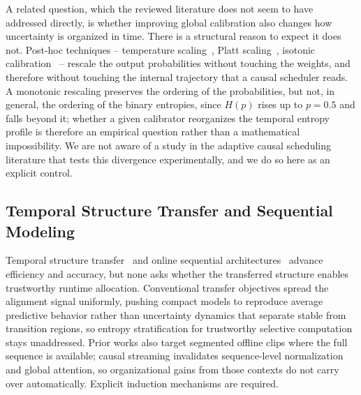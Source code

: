 \documentclass[a4paper,fleqn]{cas-dc}
\begin{document}
A related question, which the reviewed literature does not seem to have addressed
directly, is whether improving global calibration also changes how uncertainty is
organized in time. There is a structural reason to expect it does not. Post-hoc
techniques -- temperature scaling~\cite{guo2017calibration}, Platt
scaling~\cite{platt1999probabilistic}, isotonic
calibration~\cite{zadrozny2002isotonic} -- rescale the output probabilities without
touching the weights, and therefore without touching the internal trajectory that a
causal scheduler reads. {\color{\revcolor}A monotonic rescaling preserves the ordering of the
probabilities, but not, in general, the ordering of the binary entropies,
since $H(p)$ rises up to $p=0.5$ and falls beyond it; whether a given
calibrator reorganizes the temporal entropy profile is therefore an
empirical question rather than a mathematical impossibility.} We are
not aware of a study in the adaptive causal scheduling literature that tests this
divergence experimentally, and we do so here as an explicit control.
\subsection{Temporal Structure Transfer and Sequential Modeling}
\label{sec:rel_temporal}
Temporal structure transfer~\cite{hinton2015distilling,bajestani2020tkd,zheng2024tempdistiller} and online sequential architectures~\cite{zhao2022testra,lstr2021} advance efficiency and accuracy, but none asks whether the transferred structure enables trustworthy runtime allocation. Conventional transfer objectives spread the alignment signal uniformly, pushing compact models to reproduce average predictive behavior rather than uncertainty dynamics that separate stable from transition regions, so entropy stratification for trustworthy selective computation stays unaddressed. Prior works also target segmented offline clips where the full sequence is available; causal streaming invalidates sequence-level normalization and global attention, so organizational gains from those contexts do not carry over automatically. Explicit induction mechanisms are required.
\end{document}
